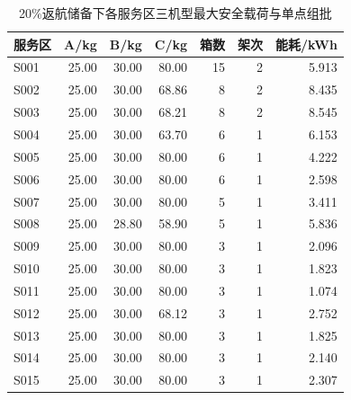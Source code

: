 \begin{table}[H]\centering\scriptsize
\caption{20\%返航储备下各服务区三机型最大安全载荷与单点组批}\label{tab:q1_capacity_batches}
\begin{tabular}{lrrrrrr}
\toprule
服务区 & A/kg & B/kg & C/kg & 箱数 & 架次 & 能耗/kWh\\\midrule
S001 & 25.00 & 30.00 & 80.00 & 15 & 2 & 5.913\\
S002 & 25.00 & 30.00 & 68.86 & 8 & 2 & 8.435\\
S003 & 25.00 & 30.00 & 68.21 & 8 & 2 & 8.545\\
S004 & 25.00 & 30.00 & 63.70 & 6 & 1 & 6.153\\
S005 & 25.00 & 30.00 & 80.00 & 6 & 1 & 4.222\\
S006 & 25.00 & 30.00 & 80.00 & 6 & 1 & 2.598\\
S007 & 25.00 & 30.00 & 80.00 & 5 & 1 & 3.411\\
S008 & 25.00 & 28.80 & 58.90 & 5 & 1 & 5.836\\
S009 & 25.00 & 30.00 & 80.00 & 3 & 1 & 2.096\\
S010 & 25.00 & 30.00 & 80.00 & 3 & 1 & 1.823\\
S011 & 25.00 & 30.00 & 80.00 & 3 & 1 & 1.074\\
S012 & 25.00 & 30.00 & 68.12 & 3 & 1 & 2.752\\
S013 & 25.00 & 30.00 & 80.00 & 3 & 1 & 1.825\\
S014 & 25.00 & 30.00 & 80.00 & 3 & 1 & 2.140\\
S015 & 25.00 & 30.00 & 80.00 & 3 & 1 & 2.307\\
\bottomrule\end{tabular}
\end{table}
